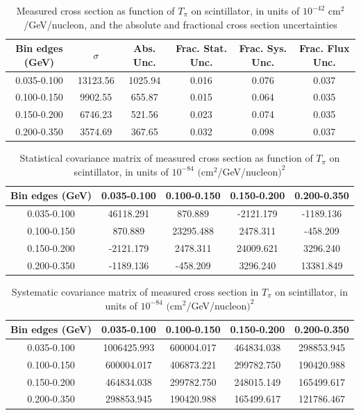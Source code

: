\documentclass[../main.tex]{subfiles}
\begin{document}
\pagebreak
\begin{turnpage}
\end{turnpage}
\begin{table}
  \centering
  \renewcommand{\arraystretch}{1.15}
  \caption{Measured cross section as function of $T_{\pi}$ on scintillator, in units of $10^{-42}$ $\text{cm}^2$/GeV/nucleon, and the absolute and fractional cross section uncertainties}
    \begin{tabular}{c||c|c||c|c|c}
      Bin edges (GeV) &  $\sigma$  &  Abs. Unc.  &  Frac. Stat. Unc.  &  Frac. Sys. Unc.  &  Frac. Flux Unc. \\
      \hline
      \hline
      0.035-0.100 & 13123.56 & 1025.94 & 0.016 & 0.076 & 0.037\\
      0.100-0.150 & 9902.55 & 655.87 & 0.015 & 0.064 & 0.035\\
      0.150-0.200 & 6746.23 & 521.56 & 0.023 & 0.074 & 0.035\\
      0.200-0.350 & 3574.69 & 367.65 & 0.032 & 0.098 & 0.037
    \end{tabular}
  \label{tbl:datanucleonplasticpion_ekina}
\end{table}
\begin{table}
  \centering
  \renewcommand{\arraystretch}{1.15}
  \caption{Statistical covariance matrix of measured cross section as function of $T_{\pi}$ on scintillator, in units of $10^{-84}$ $(\text{cm}^2$/GeV/nucleon$)^2$}
    \begin{tabular}{c||cccc}
      Bin edges (GeV) & 0.035-0.100 & 0.100-0.150 & 0.150-0.200 & 0.200-0.350\\
      \hline
      \hline
      0.035-0.100 & 46118.291 & 870.889 & -2121.179 & -1189.136\\
      0.100-0.150 & 870.889 & 23295.488 & 2478.311 & -458.209\\
      0.150-0.200 & -2121.179 & 2478.311 & 24009.621 & 3296.240\\
      0.200-0.350 & -1189.136 & -458.209 & 3296.240 & 13381.849
    \end{tabular}
  \label{tbl:statnucleonplasticpion_ekinb}
\end{table}
\begin{table}
  \centering
  \renewcommand{\arraystretch}{1.15}
  \caption{Systematic covariance matrix of measured cross section in $T_{\pi}$ on scintillator, in units of $10^{-84}$ $(\text{cm}^2$/GeV/nucleon$)^2$}
    \begin{tabular}{c||cccc}
      Bin edges (GeV) & 0.035-0.100 & 0.100-0.150 & 0.150-0.200 & 0.200-0.350\\
      \hline
      \hline
      0.035-0.100 & 1006425.993 & 600004.017 & 464834.038 & 298853.945\\
      0.100-0.150 & 600004.017 & 406873.221 & 299782.750 & 190420.988\\
      0.150-0.200 & 464834.038 & 299782.750 & 248015.149 & 165499.617\\
      0.200-0.350 & 298853.945 & 190420.988 & 165499.617 & 121786.467
    \end{tabular}
  \label{tbl:sysnucleonplasticpion_ekinc}
\end{table}
\end{document}
